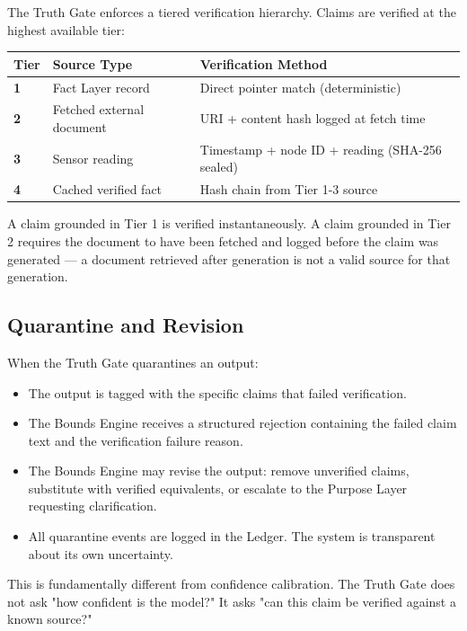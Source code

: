 \documentclass[12pt]{article}
\begin{document}
The Truth Gate enforces a tiered verification hierarchy. Claims are verified at the highest available tier:

\begin{center}
\begin{tabular}{>{\bfseries}p{2cm} p{5cm} p{4cm}}
\toprule
\textbf{Tier} & \textbf{Source Type} & \textbf{Verification Method} \\
\midrule
1 & Fact Layer record & Direct pointer match (deterministic) \\
2 & Fetched external document & URI + content hash logged at fetch time \\
3 & Sensor reading & Timestamp + node ID + reading (SHA-256 sealed) \\
4 & Cached verified fact & Hash chain from Tier 1-3 source \\
\bottomrule
\end{tabular}
\end{center}

A claim grounded in Tier 1 is verified instantaneously. A claim grounded in Tier 2 requires the document to have been fetched and logged before the claim was generated --- a document retrieved after generation is not a valid source for that generation.

\subsection{Quarantine and Revision}

When the Truth Gate quarantines an output:

\begin{itemize}[noitemsep]
    \item The output is tagged with the specific claims that failed verification.
    \item The Bounds Engine receives a structured rejection containing the failed claim text and the verification failure reason.
    \item The Bounds Engine may revise the output: remove unverified claims, substitute with verified equivalents, or escalate to the Purpose Layer requesting clarification.
    \item All quarantine events are logged in the Ledger. The system is transparent about its own uncertainty.
\end{itemize}

This is fundamentally different from confidence calibration. The Truth Gate does not ask "how confident is the model?" It asks "can this claim be verified against a known source?"
\end{document}
